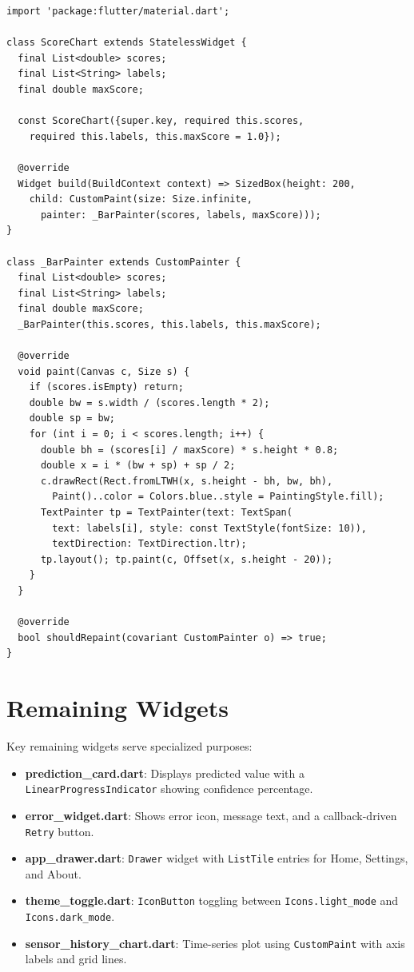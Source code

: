\documentclass[12pt,a4paper,oneside]{report}
\newcommand{\code}[1]{\texttt{#1}}
\begin{document}
\begin{lstlisting}[style=dartstyle]
import 'package:flutter/material.dart';

class ScoreChart extends StatelessWidget {
  final List<double> scores;
  final List<String> labels;
  final double maxScore;

  const ScoreChart({super.key, required this.scores,
    required this.labels, this.maxScore = 1.0});

  @override
  Widget build(BuildContext context) => SizedBox(height: 200,
    child: CustomPaint(size: Size.infinite,
      painter: _BarPainter(scores, labels, maxScore)));
}

class _BarPainter extends CustomPainter {
  final List<double> scores;
  final List<String> labels;
  final double maxScore;
  _BarPainter(this.scores, this.labels, this.maxScore);

  @override
  void paint(Canvas c, Size s) {
    if (scores.isEmpty) return;
    double bw = s.width / (scores.length * 2);
    double sp = bw;
    for (int i = 0; i < scores.length; i++) {
      double bh = (scores[i] / maxScore) * s.height * 0.8;
      double x = i * (bw + sp) + sp / 2;
      c.drawRect(Rect.fromLTWH(x, s.height - bh, bw, bh),
        Paint()..color = Colors.blue..style = PaintingStyle.fill);
      TextPainter tp = TextPainter(text: TextSpan(
        text: labels[i], style: const TextStyle(fontSize: 10)),
        textDirection: TextDirection.ltr);
      tp.layout(); tp.paint(c, Offset(x, s.height - 20));
    }
  }

  @override
  bool shouldRepaint(covariant CustomPainter o) => true;
}
\end{lstlisting}

\section{Remaining Widgets}

Key remaining widgets serve specialized purposes:

\begin{itemize}
  \item \textbf{prediction\_card.dart}: Displays predicted value with a \code{LinearProgressIndicator} showing confidence percentage.
  \item \textbf{error\_widget.dart}: Shows error icon, message text, and a callback-driven \texttt{Retry} button.
  \item \textbf{app\_drawer.dart}: \code{Drawer} widget with \code{ListTile} entries for Home, Settings, and About.
  \item \textbf{theme\_toggle.dart}: \code{IconButton} toggling between \code{Icons.light\_mode} and \code{Icons.dark\_mode}.
  \item \textbf{sensor\_history\_chart.dart}: Time-series plot using \code{CustomPaint} with axis labels and grid lines.
\end{itemize}
\end{document}
